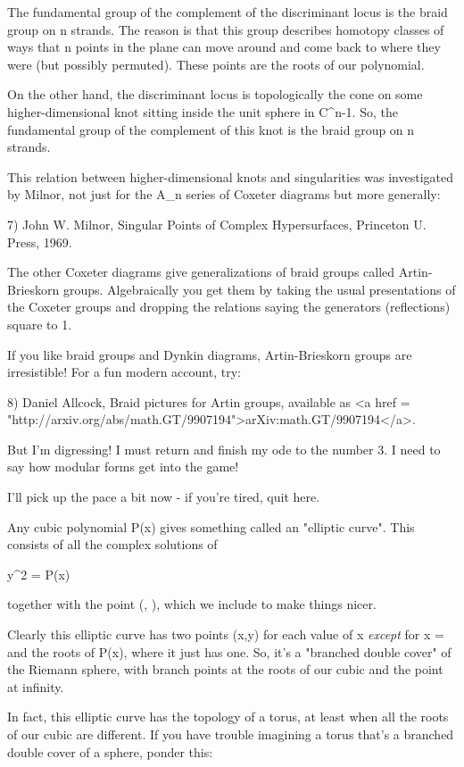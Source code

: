 The fundamental group of the complement of the discriminant locus
is the braid group on n strands.  The reason is that this group
describes homotopy classes of ways that n points in the plane can
move around and come back to where they were (but possibly permuted).
These points are the roots of our polynomial.

On the other hand, the discriminant locus is topologically the cone 
on some higher-dimensional knot sitting inside the unit sphere in 
C^{n-1}.  So, the fundamental group of the complement of this knot
is the braid group on n strands.

This relation between higher-dimensional knots and singularities 
was investigated by Milnor, not just for the A_{n} series of Coxeter 
diagrams but more generally:

7) John W. Milnor, Singular Points of Complex Hypersurfaces, 
Princeton U. Press, 1969.

The other Coxeter diagrams give generalizations of braid groups
called Artin-Brieskorn groups.  Algebraically you get them by taking
the usual presentations of the Coxeter groups and dropping the 
relations saying the generators (reflections) square to 1.  

If you like braid groups and Dynkin diagrams, Artin-Brieskorn groups 
are irresistible!  For a fun modern account, try:

8) Daniel Allcock, Braid pictures for Artin groups, available as
<a href = "http://arxiv.org/abs/math.GT/9907194">arXiv:math.GT/9907194</a>.

But I'm digressing!  I must return and finish my ode to the number 3.
I need to say how modular forms get into the game!

I'll pick up the pace a bit now - if you're tired, quit here.

Any cubic polynomial P(x) gives something called an "elliptic
curve".  This consists of all the complex solutions of

y^{2} = P(x)

together with the point (\infty , \infty ), which we include to
make things nicer.

Clearly this elliptic curve has two points (x,y) for each value of x
\emph{except} for x = \infty  and the roots of P(x), where it just has one.
So, it's a "branched double cover" of the Riemann sphere,
with branch points at the roots of our cubic and the point at infinity.

In fact, this elliptic curve has the topology of a torus, at least 
when all the roots of our cubic are different.  If you have trouble
imagining a torus that's a branched double cover of a sphere, ponder
this:

